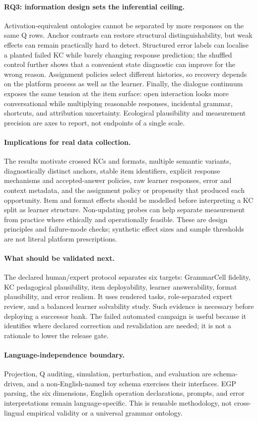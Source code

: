 \paragraph{RQ3: information design sets the inferential ceiling.}
Activation-equivalent ontologies cannot be separated by more responses on the
same Q rows.  Anchor contrasts can restore structural distinguishability, but
weak effects can remain practically hard to detect.  Structured error labels
can localise a planted failed KC while barely changing response prediction;
the shuffled control further shows that a convenient state diagnostic can
improve for the wrong reason.  Assignment policies select different histories,
so recovery depends on the platform process as well as the learner.  Finally,
the dialogue continuum exposes the same tension at the item surface: open
interaction looks more conversational while multiplying reasonable responses,
incidental grammar, shortcuts, and attribution uncertainty.  Ecological
plausibility and measurement precision are axes to report, not endpoints of a
single scale.

\paragraph{Implications for real data collection.}
The results motivate crossed KCs and formats, multiple semantic variants,
diagnostically distinct anchors, stable item identifiers, explicit response
mechanisms and accepted-answer policies, raw learner responses, error and
context metadata, and the assignment policy or propensity that produced each
opportunity.  Item and format effects should be modelled before interpreting a
KC split as learner structure.  Non-updating probes can help separate
measurement from practice where ethically and operationally feasible.  These
are design principles and failure-mode checks; synthetic effect sizes and
sample thresholds are not literal platform prescriptions.

\paragraph{What should be validated next.}
The declared human/expert protocol separates six targets: GrammarCell fidelity,
KC pedagogical plausibility, item deployability, learner answerability, format
plausibility, and error realism.  It uses rendered tasks, role-separated expert
review, and a balanced learner solvability study.  Such evidence is necessary
before deploying a successor bank.  The failed automated campaign is useful
because it identifies where declared correction and revalidation are needed;
it is not a rationale to lower the release gate.

\paragraph{Language-independence boundary.}
Projection, Q auditing, simulation, perturbation, and evaluation are
schema-driven, and a non-English-named toy schema exercises their interfaces.
EGP parsing, the six dimensions, English operation declarations, prompts, and
error interpretations remain language-specific.  This is reusable methodology,
not cross-lingual empirical validity or a universal grammar ontology.
